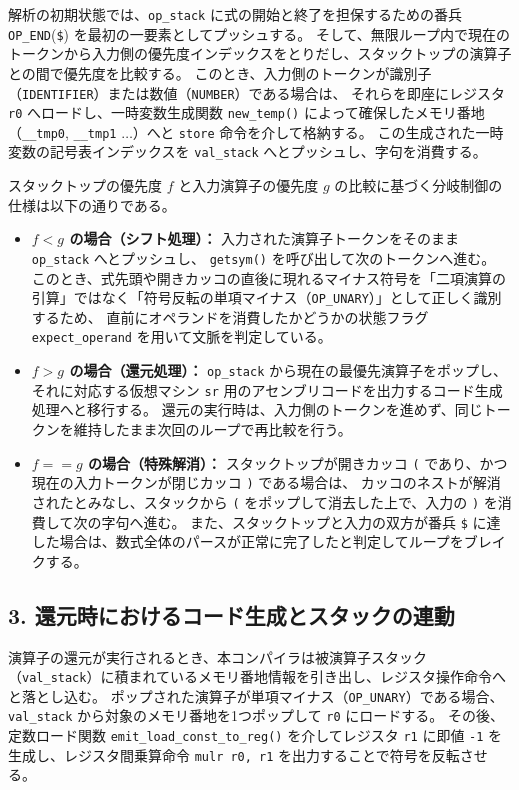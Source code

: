 \documentclass[11pt,a4paper,dvipdfmx]{bxjsarticle}
\begin{document}
解析の初期状態では、\texttt{op\_stack} に式の開始と終了を担保するための番兵 \texttt{OP\_END}(\texttt{\$}) を最初の一要素としてプッシュする。
そして、無限ループ内で現在のトークンから入力側の優先度インデックスをとりだし、スタックトップの演算子との間で優先度を比較する。
このとき、入力側のトークンが識別子（\texttt{IDENTIFIER}）または数値（\texttt{NUMBER}）である場合は、
それらを即座にレジスタ \texttt{r0} へロードし、一時変数生成関数 \texttt{new\_temp()} によって確保したメモリ番地（\texttt{\_\_tmp0}, \texttt{\_\_tmp1} $\dots$）へと \texttt{store} 命令を介して格納する。
この生成された一時変数の記号表インデックスを \texttt{val\_stack} へとプッシュし、字句を消費する。

スタックトップの優先度 $f$ と入力演算子の優先度 $g$ の比較に基づく分岐制御の仕様は以下の通りである。
\begin{itemize}
    \item \textbf{$f < g$ の場合（シフト処理）：} 入力された演算子トークンをそのまま \texttt{op\_stack} へとプッシュし、
    \texttt{getsym()} を呼び出して次のトークンへ進む。
    このとき、式先頭や開きカッコの直後に現れるマイナス符号を「二項演算の引算」ではなく「符号反転の単項マイナス（\texttt{OP\_UNARY}）」として正しく識別するため、
    直前にオペランドを消費したかどうかの状態フラグ \texttt{expect\_operand} を用いて文脈を判定している。
    \item \textbf{$f > g$ の場合（還元処理）：} \texttt{op\_stack} から現在の最優先演算子をポップし、
    それに対応する仮想マシン \texttt{sr} 用のアセンブリコードを出力するコード生成処理へと移行する。
    還元の実行時は、入力側のトークンを進めず、同じトークンを維持したまま次回のループで再比較を行う。
    \item \textbf{$f == g$ の場合（特殊解消）：} スタックトップが開きカッコ \texttt{(} であり、かつ現在の入力トークンが閉じカッコ \texttt{)} である場合は、
    カッコのネストが解消されたとみなし、スタックから \texttt{(} をポップして消去した上で、入力の \texttt{)} を消費して次の字句へ進む。
    また、スタックトップと入力の双方が番兵 \texttt{\$} に達した場合は、数式全体のパースが正常に完了したと判定してループをブレイクする。
\end{itemize}

\subsection*{3. 還元時におけるコード生成とスタックの連動}
演算子の還元が実行されるとき、本コンパイラは被演算子スタック（\texttt{val\_stack}）に積まれているメモリ番地情報を引き出し、レジスタ操作命令へと落とし込む。
ポップされた演算子が単項マイナス（\texttt{OP\_UNARY}）である場合、\texttt{val\_stack} から対象のメモリ番地を1つポップして \texttt{r0} にロードする。
その後、定数ロード関数 \texttt{emit\_load\_const\_to\_reg()} を介してレジスタ \texttt{r1} に即値 \texttt{-1} を生成し、レジスタ間乗算命令 \texttt{mulr r0, r1} を出力することで符号を反転させる。
\end{document}
